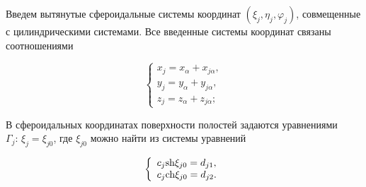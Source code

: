 Введем вытянутые сфероидальные системы координат $(\xi_j,\eta_j,\varphi_j)$, совмещенные с цилиндрическими системами. Все введенные системы координат связаны соотношениями 

\begin{equation}
\left\{ {\begin{array}{*{20}{l}}
{{x_j} = {x_\alpha} + {x_{j\alpha}},}\\
{{y_j} = {y_\alpha} + {y_{j\alpha}},}\\
{{z_j} = {z_\alpha} + {z_{j\alpha}};}
\end{array}} \right.
\end{equation}

%
%
%

В сфероидальных координатах поверхности полостей задаются уравнениями $\Gamma_j:\,\xi_j=\xi_{j0}$, где $\xi_{j0}$ можно найти из системы уравнений

\begin{equation}
\left\{ {\begin{array}{*{20}{l}}
{{c_j}{\mathop{\rm sh}\nolimits} {\xi _{j0}} = {d_{j1}},}\\
{{c_j}{\mathop{\rm ch}\nolimits} {\xi _{j0}} = {d_{j2}}.}
\end{array}} \right.
\end{equation}

